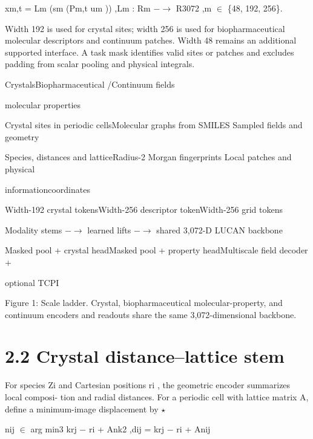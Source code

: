 \documentclass[11pt]{article}
\begin{document}
\noindent xm,t = Lm (sm (Pm,t um )) ,\quad Lm : Rm \ensuremath{-}\ensuremath{\to} R3072 ,\quad m \ensuremath{\in} \{48, 192, 256\}.\par

Width 192 is used for crystal sites; width 256 is used for biopharmaceutical molecular
descriptors and continuum patches. Width 48 remains an additional supported interface.
A task mask identifies valid sites or patches and excludes padding from scalar pooling and
physical integrals.

\noindent Crystals\quad Biopharmaceutical /\quad Continuum fields\par

molecular properties

\noindent Crystal sites in periodic cells\quad Molecular graphs from SMILES Sampled fields and geometry\par


\noindent Species, distances and lattice\quad Radius-2 Morgan fingerprints  Local patches and physical\par


\noindent information\quad coordinates\par


\noindent Width-192 crystal tokens\quad Width-256 descriptor token\quad Width-256 grid tokens\par

Modality stems \ensuremath{-}\ensuremath{\to} learned lifts \ensuremath{-}\ensuremath{\to} shared 3,072-D LUCAN backbone

\noindent Masked pool + crystal head\quad Masked pool + property head\quad Multiscale field decoder +\par

optional TCPI

Figure 1: Scale ladder. Crystal, biopharmaceutical molecular-property, and continuum encoders
and readouts share the same 3,072-dimensional backbone.


\section*{2.2 Crystal distance–lattice stem}

For species Zi and Cartesian positions ri , the geometric encoder summarizes local composi-
tion and radial distances. For a periodic cell with lattice matrix A, define a minimum-image
displacement by
\ensuremath{\star}

\noindent nij \ensuremath{\in} arg min3 krj \ensuremath{-} ri + Ank2 ,\quad dij = krj \ensuremath{-} ri + Anij\par
\end{document}
